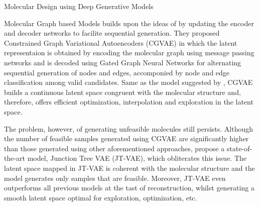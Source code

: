 \documentclass{article}
\begin{document}
\begin{psection}{Molecular Design using Deep Generative Models}
\begin{psubsection}{Molecular Graph based Models}
	\cite{cgvae} builds upon the ideas of \cite{vaer} by updating the encoder and decoder networks to facilite sequential generation. They proposed Constrained Graph Variational Autoencoders (CGVAE) in which the latent representaion is obtained by encoding the molecular graph using message passing networks and is decoded using Gated Graph Neural Networks for alternating sequential generation of nodes and edges, accomponied by node and edge classification among valid candidates. Same as the model suggested by \cite{vaer}, CGVAE builds a continuous latent space congruent with the molecular structure and, therefore, offers efficient optimization, interpolation and exploration in the latent space.

	The problem, however, of generating unfeasible molecules still persists. Although the number of feasible samples generated using CGVAE are significantly higher than those generated using other aforementioned approaches, \cite{jtvae} propose a state-of-the-art model, Junction Tree VAE (JT-VAE), which obliterates this issue. The latent space mapped in JT-VAE is coherent with the molecular structure and the model generates only samples that are feasible. Moreover, JT-VAE even outperforms all previous models at the tast of reconstruction, whilst generating a smooth latent space optimal for exploration, optimization, etc.

\end{psubsection}

\end{psection}
\end{document}
